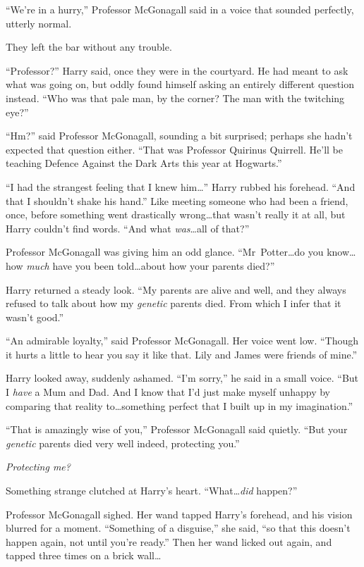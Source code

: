 “We’re in a hurry,” Professor McGonagall said in a voice that sounded perfectly, utterly normal.

They left the bar without any trouble.

“Professor?” Harry said, once they were in the courtyard. He had meant to ask what was going on, but oddly found himself asking an entirely different question instead. “Who was that pale man, by the corner? The man with the twitching eye?”

“Hm?” said Professor McGonagall, sounding a bit surprised; perhaps she hadn’t expected that question either. “That was Professor Quirinus Quirrell. He’ll be teaching Defence Against the Dark Arts this year at Hogwarts.”

“I had the strangest feeling that I knew him…” Harry rubbed his forehead. “And that I shouldn’t shake his hand.” Like meeting someone who had been a friend, once, before something went drastically wrong…that wasn’t really it at all, but Harry couldn’t find words. “And what \emph{was}…all of that?”

Professor McGonagall was giving him an odd glance. “Mr~Potter…do you know…how \emph{much} have you been told…about how your parents died?”

Harry returned a steady look. “My parents are alive and well, and they always refused to talk about how my \emph{genetic} parents died. From which I infer that it wasn’t good.”

“An admirable loyalty,” said Professor McGonagall. Her voice went low. “Though it hurts a little to hear you say it like that. Lily and James were friends of mine.”

Harry looked away, suddenly ashamed. “I’m sorry,” he said in a small voice. “But I \emph{have} a Mum and Dad. And I know that I’d just make myself unhappy by comparing that reality to…something perfect that I built up in my imagination.”

“That is amazingly wise of you,” Professor McGonagall said quietly. “But your \emph{genetic} parents died very well indeed, protecting you.”

\emph{Protecting me?}

Something strange clutched at Harry’s heart. “What…\emph{did} happen?”

Professor McGonagall sighed. Her wand tapped Harry’s forehead, and his vision blurred for a moment. “Something of a disguise,” she said, “so that this doesn’t happen again, not until you’re ready.” Then her wand licked out again, and tapped three times on a brick wall…

